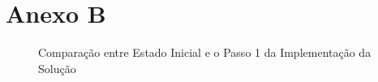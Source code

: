 \chapter{Anexo B} 	
\begin{landscape}
\label{appendix-b}

\begin{figure}[H]
    \centering
    \qquad
    \caption{Comparação entre Estado Inicial e o Passo 1 da Implementação da Solução}%
\end{figure}


\end{landscape}
